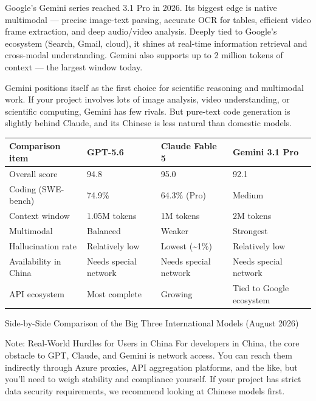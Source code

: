 Google's Gemini series reached 3.1 Pro in 2026. Its biggest edge is native multimodal — precise image-text parsing, accurate OCR for tables, efficient video frame extraction, and deep audio/video analysis. Deeply tied to Google's ecosystem (Search, Gmail, cloud), it shines at real-time information retrieval and cross-modal understanding. Gemini also supports up to 2 million tokens of context — the largest window today.

Gemini positions itself as the first choice for scientific reasoning and multimodal work. If your project involves lots of image analysis, video understanding, or scientific computing, Gemini has few rivals. But pure-text code generation is slightly behind Claude, and its Chinese is less natural than domestic models.

\begin{center}
\begin{tabularx}{\linewidth}{|X|X|X|X|}
\hline
\textbf{Comparison item} & \textbf{GPT-5.6} & \textbf{Claude Fable 5} & \textbf{Gemini 3.1 Pro} \tabularnewline
\hline
Overall score & 94.8 & 95.0 & 92.1 \tabularnewline
Coding (SWE-bench) & 74.9\% & 64.3\% (Pro) & Medium \tabularnewline
Context window & 1.05M tokens & 1M tokens & 2M tokens \tabularnewline
Multimodal & Balanced & Weaker & Strongest \tabularnewline
Hallucination rate & Relatively low & Lowest (\textasciitilde{}1\%) & Relatively low \tabularnewline
Availability in China & Needs special network & Needs special network & Needs special network \tabularnewline
API ecosystem & Most complete & Growing & Tied to Google ecosystem \tabularnewline
\hline
\end{tabularx}
\end{center}

\begin{center}\small\color{gray}Side-by-Side Comparison of the Big Three International Models (August 2026)\end{center}

\begin{tcbwarn}{Note: Real-World Hurdles for Users in China}
For developers in China, the core obstacle to GPT, Claude, and Gemini is network access. You can reach them indirectly through Azure proxies, API aggregation platforms, and the like, but you'll need to weigh stability and compliance yourself. If your project has strict data security requirements, we recommend looking at Chinese models first.

\end{tcbwarn}

